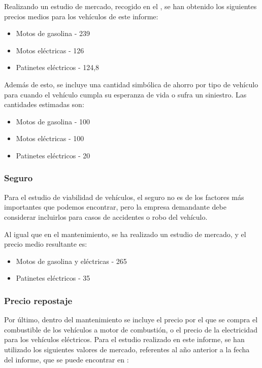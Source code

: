 Realizando un estudio de mercado, recogido en el , se han obtenido los siguientes precios medios para los vehículos de este informe:

\begin{itemize}
    \item{Motos de gasolina - 239 }
    \item{Motos eléctricas - 126 }
    \item{Patinetes eléctricos - 124,8 }
\end{itemize}

Además de esto, se incluye una cantidad simbólica de ahorro por tipo de vehículo para cuando el vehículo cumpla su esperanza de vida o sufra un \gls{siniestro}. Las cantidades estimadas son:

\begin{itemize}
    \item{Motos de gasolina - 100 }
    \item{Motos eléctricas - 100 }
    \item{Patinetes eléctricos - 20 }
\end{itemize}


\subsubsection{Seguro}
\label{consideraciones_preliminares_seguro}
Para el estudio de viabilidad de vehículos, el seguro no es de los factores más importantes que podemos encontrar, pero la empresa demandante debe considerar incluirlos para casos de accidentes o robo del vehículo.

Al igual que en el mantenimiento, se ha realizado un estudio de mercado, y el precio medio resultante es:
\begin{itemize}
    \item{Motos de gasolina y eléctricas - 265 }
    \item{Patinetes eléctricos - 35 }
\end{itemize}



\subsubsection{Precio repostaje}
\label{consideraciones_preliminares_precio_repostaje}
Por último, dentro del mantenimiento se incluye el precio por el que se compra el combustible de los vehículos a motor de combustión, o el precio de la electricidad para los vehículos eléctricos. Para el estudio realizado en este informe, se han utilizado los siguientes valores de mercado, referentes al año anterior a la fecha del informe, que se puede encontrar en :

